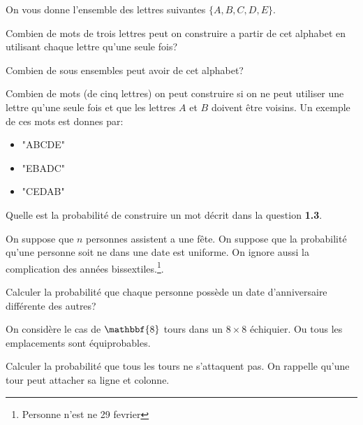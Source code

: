 \documentclass[11pt,largemargins]{homework}
\begin{document}
\maketitle


On vous donne l'ensemble des lettres suivantes $\{A,B,C,D,E\}$.
\begin{arabicparts}
  \item Combien de mots de trois lettres peut on construire a partir de cet
    alphabet en utilisant chaque lettre qu'une seule fois?
  \item Combien de sous ensembles peut avoir de cet alphabet?
  \item Combien de mots (de cinq lettres) on peut construire si on ne peut
    utiliser une lettre qu'une seule fois et que les lettres $A$ et $B$ doivent
    être voisins. Un exemple de ces mots est donnes par:

    
    \begin{multicols}{3}
     \begin{itemize}
     \item "ABCDE" 
     \item "EBADC"
     \item "CEDAB"
     \end{itemize}
   \end{multicols}
 \item Quelle est la probabilité de construire un mot décrit dans  la question
   \textbf{1.3}.
\end{arabicparts}



On suppose que $n$ personnes assistent a une fête. On suppose que la probabilité
qu'une personne soit ne dans une date est uniforme. On ignore aussi la
complication des années bissextiles.\footnote{Personne n'est ne 29 fevrier}.\\

\begin{arabicparts}
    \item Calculer la probabilité que chaque personne possède un date
      d'anniversaire différente des autres?

\end{arabicparts}


On considère le cas de $\mathbbf{8}$ tours dans un $8 \times 8$ échiquier. Ou
tous les emplacements sont équiprobables.\\
\begin{arabicparts}
    \item Calculer la probabilité que tous les tours ne s'attaquent pas. On
      rappelle qu'une tour peut attacher sa ligne et colonne.
\end{arabicparts}
\end{document}
